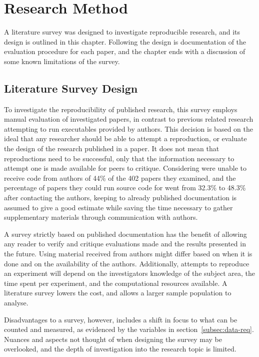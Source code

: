 
\chapter{Research Method}

A literature survey was designed to investigate reproducible research, and its design is outlined in this chapter. Following the design is documentation of the evaluation procedure for each paper, and the chapter ends with a discussion of some known limitations of the survey.

\section{Literature Survey Design}
To investigate the reproducibility of published research, this survey employs manual evaluation of investigated papers, in contrast to previous related research attempting to run executables provided by authors. This decision is based on the ideal that any researcher should be able to attempt a reproduction, or evaluate the design of the research published in a paper. It does not mean that reproductions need to be successful, only that the information necessary to attempt one is made available for peers to critique. Considering \cite{Collberg2016} were unable to receive code from authors of 44\% of the 402 papers they examined, and the percentage of papers they could run source code for went from 32.3\% to 48.3\% after contacting the authors, keeping to already published documentation is assumed to give a good estimate while saving the time necessary to gather supplementary materials through communication with authors.

A survey strictly based on published documentation has the benefit of allowing any reader to verify and critique evaluations made and the results presented in the future. Using material received from authors might differ based on when it is done and on the availability of the authors. Additionally, attempts to reproduce an experiment will depend on the investigators knowledge of the subject area, the time spent per experiment, and the computational resources available. A literature survey lowers the cost, and allows a larger sample population to analyse.

Disadvantages to a survey, however, includes a shift in focus to what can be counted and measured, as evidenced by the variables in section~\ref{subsec:data-req}. Nuances and aspects not thought of when designing the survey may be overlooked, and the depth of investigation into the research topic is limited.

